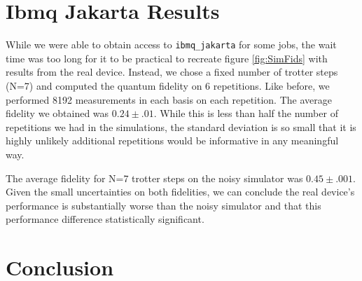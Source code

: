 \documentclass[aps,prl, reprint]{revtex4-2}
\begin{document}
\section{Ibmq Jakarta Results}

While we were able to obtain access to \texttt{ibmq\_jakarta} for some jobs, the wait time was too long for it to be practical to recreate figure \ref{fig:SimFids} with results from the real device. Instead, we chose a fixed number of trotter steps (N=7) and computed the quantum fidelity on 6 repetitions. Like before, we performed 8192 measurements in each basis on each repetition. The average fidelity we obtained was $0.24 \pm .01$. While this is less than half the number of repetitions we had in the simulations, the standard deviation is so small that it is highly unlikely additional repetitions would be informative in any meaningful way.

The average fidelity for N=7 trotter steps on the noisy simulator was $0.45 \pm .001$. Given the small uncertainties on both fidelities, we can conclude the real device's performance is substantially worse than the noisy simulator and that this performance difference statistically significant.

\section{Conclusion}


\end{document}
